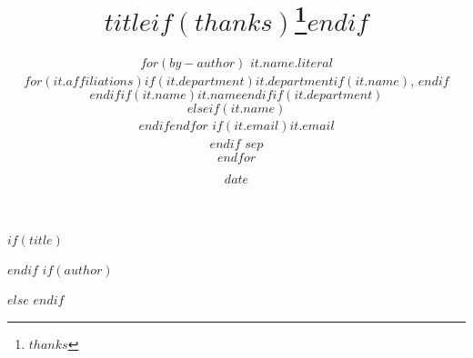 $if(title)$
\title{$title$$if(thanks)$\thanks{$thanks$}$endif$}
$endif$
$if(author)$
\author{
$for(by-author)$
$it.name.literal$\\
$for(it.affiliations)$$if(it.department)$$it.department$$if(it.name)$, $endif$\\$endif$$if(it.name)$$it.name$$endif$$if(it.department)$\\$elseif(it.name)$\\$endif$$endfor$
$if(it.email)${\tt \href{mailto:$it.email$}{$it.email$}}\\$endif$
$sep$\\\And
$endfor$}
$else$\vspace{-1in}
$endif$
\date{$date$}

